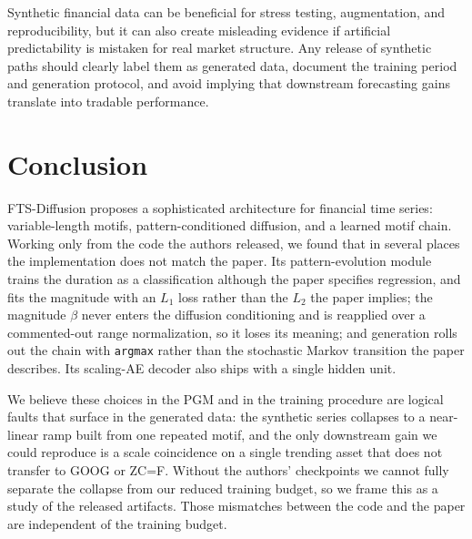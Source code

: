 \documentclass{article}
\begin{document}
Synthetic financial data can be beneficial for stress testing, augmentation, and reproducibility, but it can also create misleading evidence if artificial predictability is mistaken for real market structure. Any release of synthetic paths should clearly label them as generated data, document the training period and generation protocol, and avoid implying that downstream forecasting gains translate into tradable performance.

\section{Conclusion}

FTS-Diffusion proposes a sophisticated architecture for financial time series: variable-length motifs, pattern-conditioned diffusion, and a learned motif chain. Working only from the code the authors released, we found that in several places the implementation does not match the paper. Its pattern-evolution module trains the duration as a classification although the paper specifies regression, and fits the magnitude with an $L_1$ loss rather than the $L_2$ the paper implies; the magnitude $\beta$ never enters the diffusion conditioning and is reapplied over a commented-out range normalization, so it loses its meaning; and generation rolls out the chain with \texttt{argmax} rather than the stochastic Markov transition the paper describes. Its scaling-AE decoder also ships with a single hidden unit.

We believe these choices in the PGM and in the training procedure are logical faults that surface in the generated data: the synthetic series collapses to a near-linear ramp built from one repeated motif, and the only downstream gain we could reproduce is a scale coincidence on a single trending asset that does not transfer to GOOG or ZC=F. Without the authors' checkpoints we cannot fully separate the collapse from our reduced training budget, so we frame this as a study of the released artifacts. Those mismatches between the code and the paper are independent of the training budget.



\end{document}
